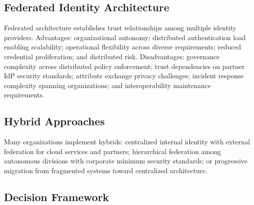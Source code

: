 \documentclass[journal]{IEEEtran}
\begin{document}
\subsection{Federated Identity Architecture}

Federated architecture establishes trust relationships among multiple identity providers.
Advantages: organizational autonomy; distributed authentication load enabling scalability;
operational flexibility across diverse requirements; reduced credential proliferation; and
distributed risk. Disadvantages: governance complexity across distributed policy
enforcement; trust dependencies on partner IdP security standards; attribute exchange
privacy challenges; incident response complexity spanning organizations; and
interoperability maintenance requirements.

\subsection{Hybrid Approaches}

Many organizations implement hybrids: centralized internal identity with external
federation for cloud services and partners; hierarchical federation among autonomous
divisions with corporate minimum security standards; or progressive migration from
fragmented systems toward centralized architecture.

\subsection{Decision Framework}
\end{document}
